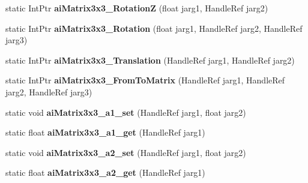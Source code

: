 \begin{DoxyCompactItemize}
\item 
\hypertarget{class_assimp_p_i_n_v_o_k_e_adb528b5bf686b0a8e3e7b4a2c65504d1}{static Int\+Ptr {\bfseries ai\+Matrix3x3\+\_\+\+Rotation\+Z} (float jarg1, Handle\+Ref jarg2)}\label{class_assimp_p_i_n_v_o_k_e_adb528b5bf686b0a8e3e7b4a2c65504d1}

\item 
\hypertarget{class_assimp_p_i_n_v_o_k_e_a6a261fcd89abcecfd3ac5f7b464d48e5}{static Int\+Ptr {\bfseries ai\+Matrix3x3\+\_\+\+Rotation} (float jarg1, Handle\+Ref jarg2, Handle\+Ref jarg3)}\label{class_assimp_p_i_n_v_o_k_e_a6a261fcd89abcecfd3ac5f7b464d48e5}

\item 
\hypertarget{class_assimp_p_i_n_v_o_k_e_a15c5bb943f864fa0e3c87f3cfc371161}{static Int\+Ptr {\bfseries ai\+Matrix3x3\+\_\+\+Translation} (Handle\+Ref jarg1, Handle\+Ref jarg2)}\label{class_assimp_p_i_n_v_o_k_e_a15c5bb943f864fa0e3c87f3cfc371161}

\item 
\hypertarget{class_assimp_p_i_n_v_o_k_e_ae1d108590991882f0f2f5451621b7480}{static Int\+Ptr {\bfseries ai\+Matrix3x3\+\_\+\+From\+To\+Matrix} (Handle\+Ref jarg1, Handle\+Ref jarg2, Handle\+Ref jarg3)}\label{class_assimp_p_i_n_v_o_k_e_ae1d108590991882f0f2f5451621b7480}

\item 
\hypertarget{class_assimp_p_i_n_v_o_k_e_a5cb19488bb8e15bce65a1dcc63685622}{static void {\bfseries ai\+Matrix3x3\+\_\+a1\+\_\+set} (Handle\+Ref jarg1, float jarg2)}\label{class_assimp_p_i_n_v_o_k_e_a5cb19488bb8e15bce65a1dcc63685622}

\item 
\hypertarget{class_assimp_p_i_n_v_o_k_e_a95d375fef2c1e876d7008798075074be}{static float {\bfseries ai\+Matrix3x3\+\_\+a1\+\_\+get} (Handle\+Ref jarg1)}\label{class_assimp_p_i_n_v_o_k_e_a95d375fef2c1e876d7008798075074be}

\item 
\hypertarget{class_assimp_p_i_n_v_o_k_e_a8763ff672502b7fb3fec42baac0dcbc4}{static void {\bfseries ai\+Matrix3x3\+\_\+a2\+\_\+set} (Handle\+Ref jarg1, float jarg2)}\label{class_assimp_p_i_n_v_o_k_e_a8763ff672502b7fb3fec42baac0dcbc4}

\item 
\hypertarget{class_assimp_p_i_n_v_o_k_e_a1375c3f480926315df19d52c4a947d64}{static float {\bfseries ai\+Matrix3x3\+\_\+a2\+\_\+get} (Handle\+Ref jarg1)}\label{class_assimp_p_i_n_v_o_k_e_a1375c3f480926315df19d52c4a947d64}


\end{DoxyCompactItemize}
